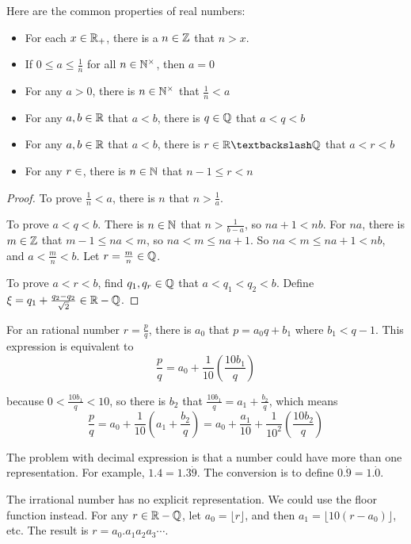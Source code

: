 \begin{theorem}
    Here are the common properties of real numbers:
    \begin{itemize}
        \item For each $x \in \mathbb{R}_{+}$, there is a $n \in \mathbb{Z}$ that $n > x$.
        \item If $\displaystyle 0 \leq a \leq \frac{1}{n}$ for all $n \in \mathbb{N}^{\times}$, then $a = 0$
        \item For any $a >0$, there is $n \in \mathbb{N}^{\times}$ that $\displaystyle \frac{1}{n} < a$
        \item For any $a,b\in \mathbb{R}$ that $a < b$, there is $q \in \mathbb{Q}$ that $a < q < b$
        \item For any $a,b\in \mathbb{R}$ that $a < b$, there is $r \in \realnumber \textbackslash \rational $ that $a < r < b$
        \item For any $r \in \real$, there is $n \in \mathbb{N}$ that $n - 1 \leq r < n$
    \end{itemize}    
\end{theorem}
\begin{proof}
    To prove $\frac{1}{n} < a$, there is $n$ that $n > \frac{1}{a}$. 
    
    To prove $a < q < b$. There is $n \in \mathbb{N}$ that $n > \frac{1}{b-a}$, so $na + 1 < nb$. For $na$, there is $m \in \mathbb{Z}$ that $m - 1 \leq na < m$, so $na < m \leq na + 1$. So $na < m \leq na + 1 < nb$, and $a < \frac{m}{n} < b$. Let $r = \frac{m}{n} \in \mathbb{Q}$.
    
    To prove $a < r < b$, find $q_1, q_r \in \mathbb{Q}$ that $a < q_1 < q_2 < b$. Define $\xi = q_1 + \frac{q_2 - q_2}{\sqrt{2}} \in \mathbb{R} - \mathbb{Q}$.
\end{proof}


\begin{example}
    For an rational number $r = \frac{p}{q}$, there is $a_0$ that $p = a_0 q + b_1$ where $b_1 < q-1$. This expression is equivalent to 
    \begin{equation}
        \frac{p}{q} = a_0 + \frac{1}{10} \left(\frac{10 b_1}{q} \right)
    \end{equation}
    
    because $0 < \frac{10 b_1}{q} < 10$, so there is $b_2$ that $\frac{10 b_1}{q} = a_1 + \frac{b_2}{q}$, which means
    \begin{equation}
        \frac{p}{q} = a_0 + \frac{1}{10} \left( a_1 + \frac{b_2}{q} \right) = a_0 + \frac{a_1}{10} + \frac{1}{10^2} \left(\frac{10 b_2}{q} \right)
    \end{equation}
    
    The problem with decimal expression is that a number could have more than one representation. For example, $1.4 = 1.3 \dot 9$. The conversion is to define $0.\dot 9 = 1.\dot 0$.
    
    The irrational number has no explicit representation. We could use the floor function instead. For any $r \in \mathbb{R} - \mathbb{Q}$, let $a_0 = \lfloor r \rfloor$, and then $a_1 = \lfloor 10(r-a_0) \rfloor$, etc. The result is $r = a_0 . a_1 a_2 a_3 \cdots$.
\end{example}


